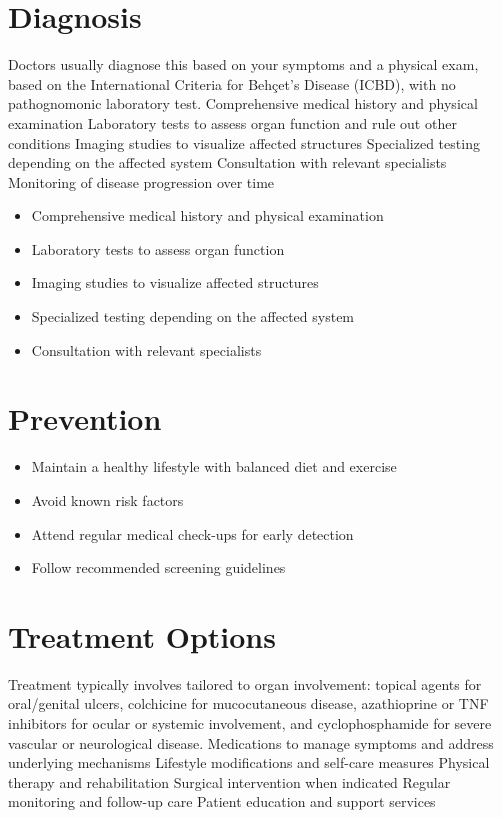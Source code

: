 \section{Diagnosis}
Doctors usually diagnose this based on your symptoms and a physical exam, based on the International Criteria for Behçet's Disease (ICBD), with no pathognomonic laboratory test. Comprehensive medical history and physical examination Laboratory tests to assess organ function and rule out other conditions Imaging studies to visualize affected structures Specialized testing depending on the affected system Consultation with relevant specialists Monitoring of disease progression over time

\begin{itemize}[noitemsep]
  \item Comprehensive medical history and physical examination
  \item Laboratory tests to assess organ function
  \item Imaging studies to visualize affected structures
  \item Specialized testing depending on the affected system
  \item Consultation with relevant specialists
\end{itemize}
\section{Prevention}
\begin{itemize}[noitemsep]
  \item Maintain a healthy lifestyle with balanced diet and exercise
  \item Avoid known risk factors
  \item Attend regular medical check-ups for early detection
  \item Follow recommended screening guidelines
\end{itemize}
\section{Treatment Options}
Treatment typically involves tailored to organ involvement: topical agents for oral/genital ulcers, colchicine for mucocutaneous disease, azathioprine or TNF inhibitors for ocular or systemic involvement, and cyclophosphamide for severe vascular or neurological disease. Medications to manage symptoms and address underlying mechanisms Lifestyle modifications and self-care measures Physical therapy and rehabilitation Surgical intervention when indicated Regular monitoring and follow-up care Patient education and support services

